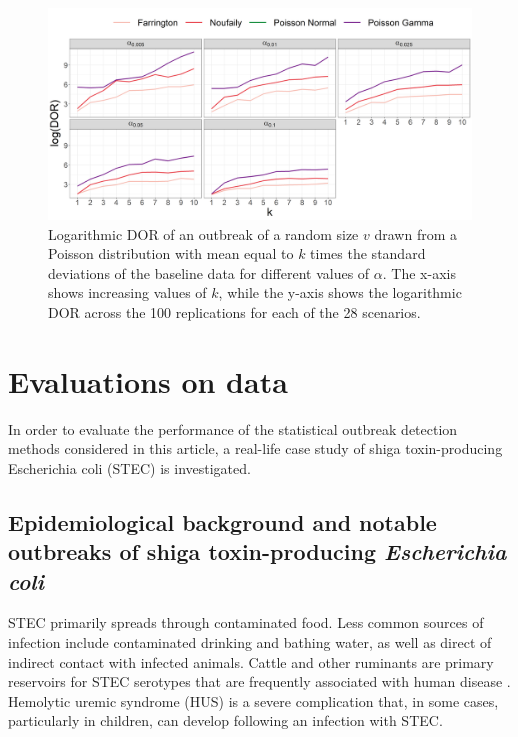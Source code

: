 \documentclass[preprint, 3p, authoryear]{elsarticle} %
\begin{document}
\begin{figure}[H]
\includegraphics[width=1\linewidth]{../../figures/logDOR_alpha} \caption{Logarithmic DOR of an outbreak of a random size \(v\) drawn from a Poisson distribution with mean equal to \(k\) times the standard deviations of the baseline data for different values of \(\alpha\). The x-axis shows increasing values of \(k\), while the y-axis shows the logarithmic DOR across the 100 replications for each of the 28 scenarios.}\label{fig:logDORalpha}
\end{figure}

\hypertarget{evaluations-on-data}{%
\section{Evaluations on data}\label{evaluations-on-data}}

In order to evaluate the performance of the statistical outbreak detection methods considered in this article, a real-life case study of shiga toxin-producing Escherichia coli (STEC) is investigated.

\hypertarget{epidemiological-background-and-notable-outbreaks-of-shiga-toxin-producing-escherichia-coli}{%
\subsection{\texorpdfstring{Epidemiological background and notable outbreaks of shiga toxin-producing \emph{Escherichia coli}}{Epidemiological background and notable outbreaks of shiga toxin-producing Escherichia coli}}\label{epidemiological-background-and-notable-outbreaks-of-shiga-toxin-producing-escherichia-coli}}

STEC primarily spreads through contaminated food. Less common sources of infection include contaminated drinking and bathing water, as well as direct of indirect contact with infected animals. Cattle and other ruminants are primary reservoirs for STEC serotypes that are frequently associated with human disease \citep{Menge_2020}. Hemolytic uremic syndrome (HUS) is a severe complication that, in some cases, particularly in children, can develop following an infection with STEC.
\end{document}
